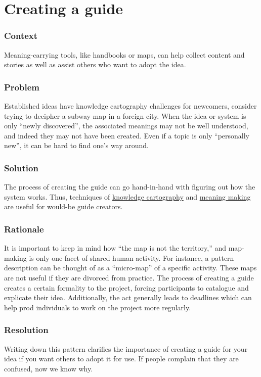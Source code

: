 \section{Creating a guide}\label{sec:Creating_a_guide}
\subsubsection*{Context} Meaning-carrying tools, like handbooks or maps, can help collect content and stories as well as assist others who want to adopt the idea.

\subsubsection*{Problem} 
Established ideas have knowledge cartography challenges for newcomers, consider trying to decipher a subway map in a foreign city. When the idea or system is only ``newly discovered'', the associated meanings may not be well understood, and indeed they may not have been created. Even if a topic is only ``personally new'', it can be hard to find one's way around.

\subsubsection*{Solution}
The process of creating the guide can go hand-in-hand with figuring out how the system works.  Thus, techniques of \href{http://knowledgecartography.org/}{knowledge cartography} and \href{http://www.hitl.washington.edu/publications/r-97-47/two.html}{meaning making} are useful for would-be guide creators.

\subsubsection*{Rationale} 
It is important to keep in mind how ``the map is not the territory,'' and map-making is only one facet of shared human activity. For instance, a pattern description can be thought of as a ``micro-map'' of a specific activity. These maps are not useful if they are divorced from practice. The process of creating a guide creates a certain formality to the project, forcing participants to catalogue and explicate their idea. Additionally, the act generally leads to deadlines which can help prod individuals to work on the project more regularly.

\subsubsection*{Resolution}
Writing down this pattern clarifies the importance of creating a guide for your idea if you want others to adopt it for use.  If people complain that they are confused, now we know why.

